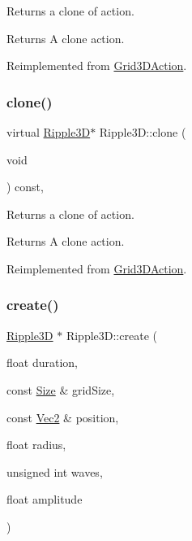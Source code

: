 Returns a clone of action.

\begin{DoxyReturn}{Returns}
A clone action. 
\end{DoxyReturn}


Reimplemented from \hyperlink{classGrid3DAction_a01d5b2d60654ef66d6551ac2190ed14c}{Grid3\+D\+Action}.

\mbox{\label{classRipple3D_a79b0876958a8e7403d8be5f6e2adfd24}} 
\subsubsection{\texorpdfstring{clone()}{clone()}\hspace{0.1cm}{\footnotesize\ttfamily [2/2]}}
{\footnotesize\ttfamily virtual \hyperlink{classRipple3D}{Ripple3D}$\ast$ Ripple3\+D\+::clone (\begin{DoxyParamCaption}\item[{void}]{ }\end{DoxyParamCaption}) const\hspace{0.3cm}{\ttfamily [override]}, {\ttfamily [virtual]}}

Returns a clone of action.

\begin{DoxyReturn}{Returns}
A clone action. 
\end{DoxyReturn}


Reimplemented from \hyperlink{classGrid3DAction_a01d5b2d60654ef66d6551ac2190ed14c}{Grid3\+D\+Action}.

\mbox{\label{classRipple3D_aec108464938f4d1f2ad5147be691ccbb}} 
\subsubsection{\texorpdfstring{create()}{create()}\hspace{0.1cm}{\footnotesize\ttfamily [1/2]}}
{\footnotesize\ttfamily \hyperlink{classRipple3D}{Ripple3D} $\ast$ Ripple3\+D\+::create (\begin{DoxyParamCaption}\item[{float}]{duration,  }\item[{const \hyperlink{classSize}{Size} \&}]{grid\+Size,  }\item[{const \hyperlink{classVec2}{Vec2} \&}]{position,  }\item[{float}]{radius,  }\item[{unsigned int}]{waves,  }\item[{float}]{amplitude }\end{DoxyParamCaption})\hspace{0.3cm}{\ttfamily [static]}}




